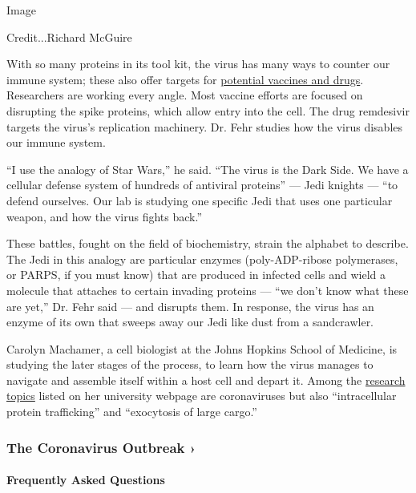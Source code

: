 Image

Credit...Richard McGuire

With so many proteins in its tool kit, the virus has many ways to
counter our immune system; these also offer targets for
\href{https://www.nytimes3xbfgragh.onion/2020/04/30/health/coronavirus-antiviral-drugs.html}{potential
vaccines and drugs}. Researchers are working every angle. Most vaccine
efforts are focused on disrupting the spike proteins, which allow entry
into the cell. The drug remdesivir targets the virus's replication
machinery. Dr. Fehr studies how the virus disables our immune system.

``I use the analogy of Star Wars,'' he said. ``The virus is the Dark
Side. We have a cellular defense system of hundreds of antiviral
proteins'' --- Jedi knights --- ``to defend ourselves. Our lab is
studying one specific Jedi that uses one particular weapon, and how the
virus fights back.''

These battles, fought on the field of biochemistry, strain the alphabet
to describe. The Jedi in this analogy are particular enzymes
(poly-ADP-ribose polymerases, or PARPS, if you must know) that are
produced in infected cells and wield a molecule that attaches to certain
invading proteins --- ``we don't know what these are yet,'' Dr. Fehr
said --- and disrupts them. In response, the virus has an enzyme of its
own that sweeps away our Jedi like dust from a sandcrawler.

Carolyn Machamer, a cell biologist at the Johns Hopkins School of
Medicine, is studying the later stages of the process, to learn how the
virus manages to navigate and assemble itself within a host cell and
depart it. Among the
\href{https://cellbio.jhmi.edu/people/faculty/carolyn-machamer-phd}{research
topics} listed on her university webpage are coronaviruses but also
``intracellular protein trafficking'' and ``exocytosis of large cargo.''

\href{https://www.nytimes3xbfgragh.onion/news-event/coronavirus?action=click\&pgtype=Article\&state=default\&region=MAIN_CONTENT_3\&context=storylines_faq}{}

\hypertarget{the-coronavirus-outbreak-}{%
\subsubsection{The Coronavirus Outbreak
›}\label{the-coronavirus-outbreak-}}

\hypertarget{frequently-asked-questions}{%
\paragraph{Frequently Asked
Questions}\label{frequently-asked-questions}}

